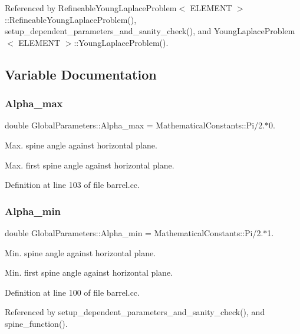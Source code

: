 Referenced by Refineable\+Young\+Laplace\+Problem$<$ E\+L\+E\+M\+E\+N\+T $>$\+::\+Refineable\+Young\+Laplace\+Problem(), setup\+\_\+dependent\+\_\+parameters\+\_\+and\+\_\+sanity\+\_\+check(), and Young\+Laplace\+Problem$<$ E\+L\+E\+M\+E\+N\+T $>$\+::\+Young\+Laplace\+Problem().



\subsection{Variable Documentation}
\mbox{\label{namespaceGlobalParameters_a19d04a02b0b5ef5c72e9c30d822e4dc7}} 
\subsubsection{\texorpdfstring{Alpha\+\_\+max}{Alpha\_max}}
{\footnotesize\ttfamily double Global\+Parameters\+::\+Alpha\+\_\+max = Mathematical\+Constants\+::\+Pi/2.$\ast$0.}



Max. spine angle against horizontal plane. 

Max. first spine angle against horizontal plane. 

Definition at line 103 of file barrel.\+cc.

\mbox{\label{namespaceGlobalParameters_ae8fa7610a34b7a2a8223eade99a5c22f}} 
\subsubsection{\texorpdfstring{Alpha\+\_\+min}{Alpha\_min}}
{\footnotesize\ttfamily double Global\+Parameters\+::\+Alpha\+\_\+min = Mathematical\+Constants\+::\+Pi/2.$\ast$1.}



Min. spine angle against horizontal plane. 

Min. first spine angle against horizontal plane. 

Definition at line 100 of file barrel.\+cc.



Referenced by setup\+\_\+dependent\+\_\+parameters\+\_\+and\+\_\+sanity\+\_\+check(), and spine\+\_\+function().

